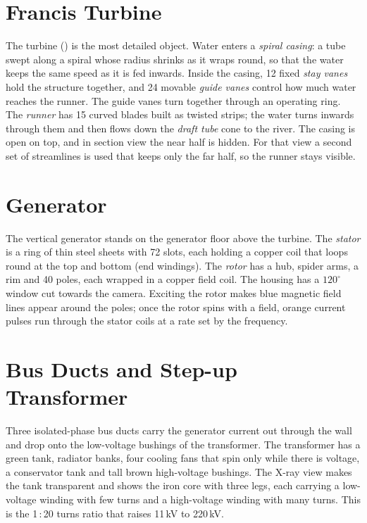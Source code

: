 \documentclass[11pt,a4paper]{report}
\newcommand{\code}[1]{\texttt{\detokenize{#1}}}
\begin{document}
\section{Francis Turbine}

The turbine (\code{TurbineUnit.cpp}) is the most detailed object. Water enters a
\emph{spiral casing}: a tube swept along a spiral whose radius shrinks as it wraps round,
so that the water keeps the same speed as it is fed inwards. Inside the casing, 12 fixed
\emph{stay vanes} hold the structure together, and 24 movable \emph{guide vanes} control
how much water reaches the runner. The guide vanes turn together through an operating
ring. The \emph{runner} has 15 curved blades built as twisted strips; the water turns
inwards through them and then flows down the \emph{draft tube} cone to the river. The
casing is open on top, and in section view the near half is hidden. For that view a
second set of streamlines is used that keeps only the far half, so the runner stays
visible.

\section{Generator}

The vertical generator stands on the generator floor above the turbine. The
\emph{stator} is a ring of thin steel sheets with 72 slots, each holding a copper coil
that loops round at the top and bottom (end windings). The \emph{rotor} has a hub,
spider arms, a rim and 40 poles, each wrapped in a copper field coil. The housing has a
$120^\circ$ window cut towards the camera. Exciting the rotor makes blue magnetic field
lines appear around the poles; once the rotor spins with a field, orange current pulses
run through the stator coils at a rate set by the frequency.

\section{Bus Ducts and Step-up Transformer}

Three isolated-phase bus ducts carry the generator current out through the wall and
drop onto the low-voltage bushings of the transformer. The transformer has a green
tank, radiator banks, four cooling fans that spin only while there is voltage, a
conservator tank and tall brown high-voltage bushings. The X-ray view makes the tank
transparent and shows the iron core with three legs, each carrying a low-voltage
winding with few turns and a high-voltage winding with many turns. This is the 1\,:\,20
turns ratio that raises 11\,kV to 220\,kV.
\end{document}
